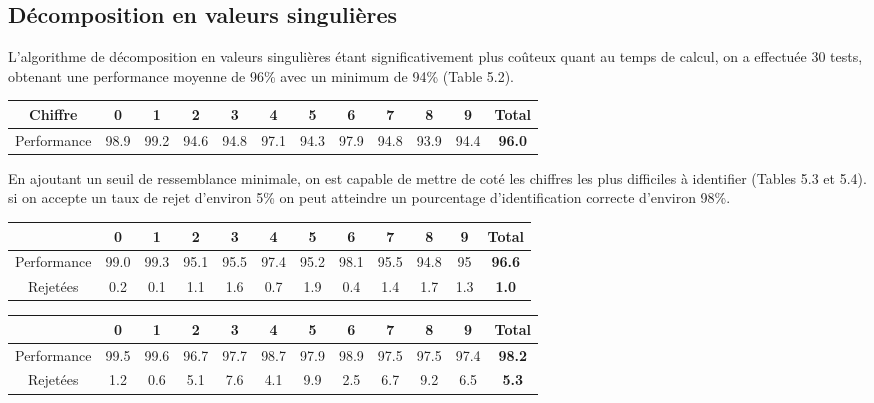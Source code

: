 \documentclass[a4paper,11pt,twoside]{report}
\begin{document}
\subsection{Décomposition en valeurs singulières}
L'algorithme de décomposition en valeurs singulières étant significativement plus coûteux quant au temps de calcul, on a effectuée 30 tests, obtenant une performance moyenne de 96\% avec un minimum de 94\% (Table 5.2).
\begin{center}
\begin{tabular}{ |c||c|c|c|c|c|c|c|c|c|c|c| } 
\hline
 Chiffre & 0 & 1 & 2 & 3 & 4 & 5 & 6 & 7 & 8 & 9 & \textbf{Total} \\ 
  \hline
  \hline
  Performance & 98.9 & 99.2 & 94.6 & 94.8 & 97.1 & 94.3 & 97.9 & 94.8 & 93.9 & 94.4 & \textbf{96.0} \\ 
\hline
\end{tabular}
\end{center}

En ajoutant un seuil de ressemblance minimale, on est capable de mettre de coté les chiffres les plus difficiles à identifier (Tables 5.3 et 5.4). si on accepte un taux de rejet d'environ 5\% on peut atteindre un pourcentage d'identification correcte d'environ 98\%.

\begin{center}
\begin{tabular}{ |c||c|c|c|c|c|c|c|c|c|c|c| } 
 \hline
   & 0 & 1 & 2 & 3 & 4 & 5 & 6 & 7 & 8 & 9 & \textbf{Total} \\ 
  \hline
  \hline
 Performance & 99.0 & 99.3 & 95.1 & 95.5 & 97.4 & 95.2 & 98.1 & 95.5 & 94.8 & 95 &  \textbf{96.6} \\
  \hline
 Rejetées & 0.2 & 0.1 & 1.1 & 1.6 & 0.7 & 1.9 & 0.4 & 1.4 & 1.7 & 1.3 & \textbf{1.0} \\
 \hline
\end{tabular}
\end{center}


\begin{center}
\begin{tabular}{ |c||c|c|c|c|c|c|c|c|c|c|c| } 
 \hline
   & 0 & 1 & 2 & 3 & 4 & 5 & 6 & 7 & 8 & 9 & \textbf{Total} \\ 
  \hline
  \hline
 Performance & 99.5 & 99.6 & 96.7 & 97.7 & 98.7 & 97.9 & 98.9 & 97.5 & 97.5 & 97.4 &  \textbf{98.2} \\
  \hline
 Rejetées & 1.2 & 0.6 & 5.1 & 7.6 & 4.1 & 9.9 & 2.5 & 6.7 & 9.2 & 6.5 & \textbf{5.3} \\
 \hline
\end{tabular}
\end{center}
\end{document}
